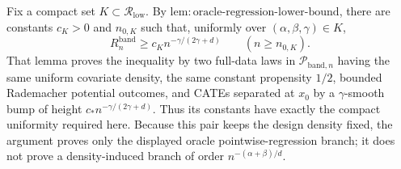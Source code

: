 Fix a compact set \(K\subset\mathcal R_{\mathrm{low}}\).  By
\(\mathrm{lem:oracle\mbox{-}regression\mbox{-}lower\mbox{-}bound}\), there
are constants \(c_K>0\) and \(n_{0,K}\) such that, uniformly over
\((\alpha,\beta,\gamma)\in K\),
\[
R_n^{\mathrm{band}}\geq c_K n^{-\gamma/(2\gamma+d)}
\qquad(n\geq n_{0,K}).
\]
That lemma proves the inequality by two full-data laws in
\(\mathcal P_{\mathrm{band},n}\) having the same uniform covariate density,
the same constant propensity \(1/2\), bounded Rademacher potential outcomes,
and CATEs separated at \(x_0\) by a \(\gamma\)-smooth bump of height
\(c_*n^{-\gamma/(2\gamma+d)}\).  Thus its constants have exactly the compact
uniformity required here.  Because this pair keeps the design density fixed,
the argument proves only the displayed oracle pointwise-regression branch; it
does not prove a density-induced branch of order
\(n^{-(\alpha+\beta)/d}\).